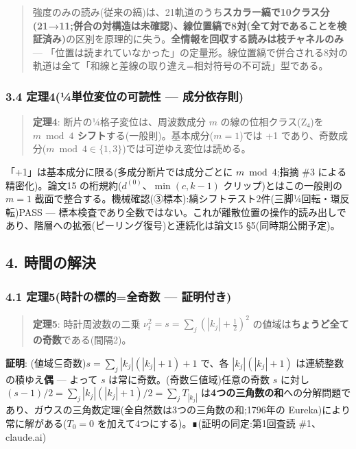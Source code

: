 \documentclass[
]{ltjsarticle}
\begin{document}
\begin{quote}
強度のみの読み(従来の縞)は、21軌道のうち\textbf{スカラー縞で10クラス分(21→11;併合の対構造は未確認)、線位置縞で8対(全て対であることを検証済み)}の区別を原理的に失う。\textbf{全情報を回収する読みは枝チャネルのみ}
---
「位置は読まれていなかった」の定量形。線位置縞で併合される8対の軌道は全て「和線と差線の取り違え=相対符号の不可読」型である。
\end{quote}

\subsubsection{3.4 定理4(¼単位変位の可読性 ---
成分依存則)}\label{ux5b9aux74064uxbcux5358ux4f4dux5909ux4f4dux306eux53efux8aadux6027-ux6210ux5206ux4f9dux5b58ux5247}

\begin{quote}
\textbf{定理4}: 断片の¼格子変位は、周波数成分 \(m\)
の線の位相クラス(Z₄)を \textbf{\(m\bmod 4\)
シフト}する(一般則)。基本成分(\(m=1\))では +1
であり、奇数成分(\(m\bmod4\in\{1,3\}\))では可逆ゆえ変位は読める。
\end{quote}

「+1」は基本成分に限る(多成分断片では成分ごとに \(m\bmod4\);指摘 \#3
による精密化)。論文15 の桁規約(\(d^{(0)}\)、\(\min(c,k{-}1)\)
クリップ)とはこの一般則の \(m=1\)
截面で整合する。機械確認(③標本):縞シフトテスト2件(三脚¼回転・環反転)PASS
---
標本検査であり全数ではない。これが離散位置の操作的読み出しであり、階層への拡張(ピーリング復号)と連続化は論文15
§5(同時期公開予定)。

\subsection{4. 時間の解決}\label{ux6642ux9593ux306eux89e3ux6c7a}

\subsubsection{4.1 定理5(時計の標的=全奇数 ---
証明付き)}\label{ux5b9aux74065ux6642ux8a08ux306eux6a19ux7684ux5168ux5947ux6570-ux8a3cux660eux4ed8ux304d}

\begin{quote}
\textbf{定理5}: 時計周波数の二乗 \(\nu_t^2=s=\sum_j(|k_j|+\tfrac12)^2\)
の値域は\textbf{ちょうど全ての奇数}である(間隔2)。
\end{quote}

\textbf{証明}: (値域⊆奇数)\(s=\sum_j|k_j|(|k_j|+1)+1\) で、各
\(|k_j|(|k_j|+1)\) は連続整数の積ゆえ\textbf{偶} --- よって \(s\)
は常に奇数。(奇数⊆値域)任意の奇数 \(s\) に対し
\((s-1)/2=\sum_j|k_j|(|k_j|+1)/2=\sum_j T_{|k_j|}\)
は\textbf{4つの三角数の和}への分解問題であり、ガウスの三角数定理(全自然数は3つの三角数の和;1796年の
Eureka)により常に解がある(\(T_0=0\)
を加えて4つにする)。∎(証明の同定:第1回査読 \#1、claude.ai)
\end{document}
